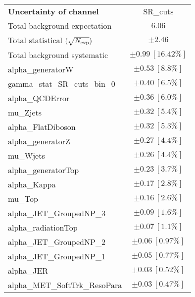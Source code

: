 
\begin{table}
\begin{center}
\setlength{\tabcolsep}{0.0pc}
\begin{tabular*}{\textwidth}{@{\extracolsep{\fill}}lc}
\noalign{\smallskip}\hline\noalign{\smallskip}
{\bf Uncertainty of channel}                                    & SR\_cuts            \\
\noalign{\smallskip}\hline\noalign{\smallskip}
Total background expectation             &  $6.06$       \\
\noalign{\smallskip}\hline\noalign{\smallskip}
Total statistical $(\sqrt{N_{\rm exp}})$              & $\pm 2.46$       \\
Total background systematic               & $\pm 0.99\ [16.42\%] $             \\
\noalign{\smallskip}\hline\noalign{\smallskip}
\noalign{\smallskip}\hline\noalign{\smallskip}
alpha\_generatorW         & $\pm 0.53\ [8.8\%] $       \\
gamma\_stat\_SR\_cuts\_bin\_0         & $\pm 0.40\ [6.5\%] $       \\
alpha\_QCDError         & $\pm 0.36\ [6.0\%] $       \\
mu\_Zjets         & $\pm 0.32\ [5.4\%] $       \\
alpha\_FlatDiboson         & $\pm 0.32\ [5.3\%] $       \\
alpha\_generatorZ         & $\pm 0.27\ [4.4\%] $       \\
mu\_Wjets         & $\pm 0.26\ [4.4\%] $       \\
alpha\_generatorTop         & $\pm 0.23\ [3.7\%] $       \\
alpha\_Kappa         & $\pm 0.17\ [2.8\%] $       \\
mu\_Top         & $\pm 0.16\ [2.6\%] $       \\
alpha\_JET\_GroupedNP\_3         & $\pm 0.09\ [1.6\%] $       \\
alpha\_radiationTop         & $\pm 0.07\ [1.1\%] $       \\
alpha\_JET\_GroupedNP\_2         & $\pm 0.06\ [0.97\%] $       \\
alpha\_JET\_GroupedNP\_1         & $\pm 0.05\ [0.77\%] $       \\
alpha\_JER         & $\pm 0.03\ [0.52\%] $       \\
alpha\_MET\_SoftTrk\_ResoPara         & $\pm 0.03\ [0.47\%] $       \\

\end{tabular*}
\end{center}
\end{table}

